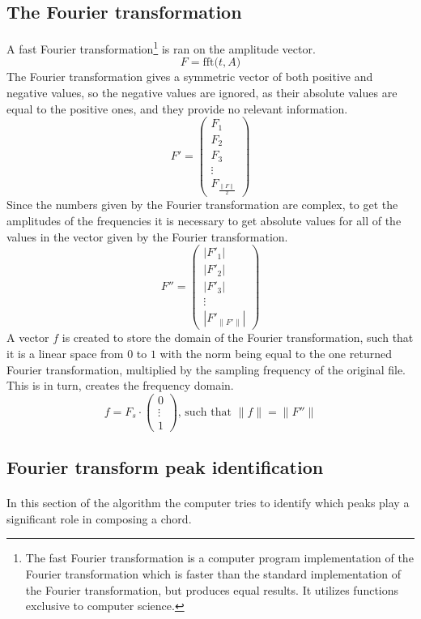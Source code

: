 \documentclass{article}
\providecommand{\norm}[1]{\lVert#1\rVert}
\begin{document}
\subsection{The Fourier transformation}
A fast Fourier transformation\footnote{The fast Fourier transformation is a 
computer program implementation of the Fourier transformation which is faster
than the standard implementation of the Fourier transformation, but produces 
equal results. It utilizes functions exclusive to computer science.} is ran on 
the amplitude vector.
$$F = \text{fft(}t, A\text{)}$$
The Fourier transformation gives a symmetric vector of both positive and 
negative values, so the negative values are ignored, as their absolute values 
are equal to the positive ones, and they provide no relevant information.
$$F' =
\begin{pmatrix}
	F_1 \\
	F_2 \\
	F_3 \\
	\vdots \\
	F_{\frac{\norm{F}}{2}}
\end{pmatrix}
$$
Since the numbers given by the Fourier transformation are complex, to get the 
amplitudes of the frequencies it is necessary to get absolute values for all 
of the values in the vector given by the Fourier transformation.
$$F'' = 
\begin{pmatrix}
	|F'_1| \\
	|F'_2| \\
	|F'_3| \\
	\vdots \\
	|F'_{\norm{F'}}|
\end{pmatrix}
$$
A vector $f$ is created to store the domain of the Fourier transformation, 
such that it is a linear space from $0$ to $1$ with the norm being equal to 
the one returned Fourier transformation, multiplied by the sampling frequency 
of the original file. This is in turn, creates the frequency domain.
$$f = F_s \cdot
\begin{pmatrix}
	0 \\
	\vdots \\
	1
\end{pmatrix}\text{, such that $\norm{f} = \norm{F''}$}
$$

\subsection{Fourier transform peak identification} 
\paragraph*{}
In this section of the algorithm the computer tries to identify which peaks 
play a significant role in composing a chord. 
\end{document}
